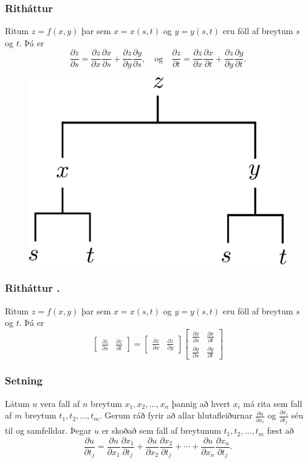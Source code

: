 \subsubsection{Ritháttur }

Ritum $z=f(x,y)$ þar sem $x=x(s,t)$ og $y=y(s,t)$ eru föll af breytum $s$ og  $t$.  Þá er 
$$\frac{\partial z}{\partial s}=
\frac{\partial z}{\partial x}\frac{\partial x}{\partial s}
+\frac{\partial z}{\partial y}\frac{\partial y}{\partial s}, \quad \text{og}\quad \frac{\partial z}{\partial t}=
\frac{\partial z}{\partial x}\frac{\partial x}{\partial t}
+\frac{\partial z}{\partial y}\frac{\partial y}{\partial t}.$$

 \begin{figure}[h!]
           \centering
            \includegraphics[width=0.35\linewidth]{chain2}
    \end{figure}


\subsubsection{Ritháttur .}
 Ritum $z=f(x,y)$ þar sem $x=x(s,t)$ og $y=y(s,t)$ eru föll af breytum $s$ og  $t$.  Þá er 
$$\begin{bmatrix}\frac{\partial z}{\partial s} 
& \frac{\partial z}{\partial t}\end{bmatrix}
=\begin{bmatrix}\frac{\partial z}{\partial x} 
& \frac{\partial z}{\partial y}\end{bmatrix}
\begin{bmatrix}\frac{\partial x}{\partial s} 
& \frac{\partial x}{\partial t}\\
\frac{\partial y}{\partial s} 
& \frac{\partial y}{\partial t}
\end{bmatrix}$$

 

\subsubsection{Setning }
Látum $u$ vera fall af $n$ breytum $x_1, x_2, \ldots, x_n$ þannig að hvert $x_i$ má rita sem fall af $m$ breytum $t_1, t_2, \ldots, t_m$.  Gerum ráð fyrir að allar hlutafleiðurnar $\frac{\partial u}{\partial x_i}$ og $\frac{\partial x_i}{\partial t_j}$ séu til og samfelldar.  Þegar $u$ er skoðað sem fall af breytunum $t_1, t_2, \ldots, t_m$ fæst að 
$$\frac{\partial u}{\partial t_j}=
\frac{\partial u}{\partial x_1}\frac{\partial x_1}{\partial t_j}
+\frac{\partial u}{\partial x_2}\frac{\partial x_2}{\partial t_j}
+\cdots+
\frac{\partial u}{\partial x_n}\frac{\partial x_n}{\partial t_j}.$$

